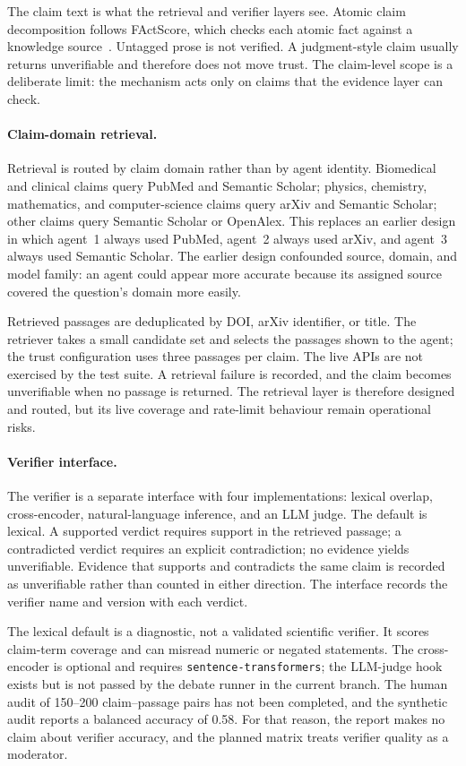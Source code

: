 The claim text is what the retrieval and verifier layers see. Atomic claim decomposition follows FActScore, which checks each atomic fact against a knowledge source~\cite{min2023factscore}. Untagged prose is not verified. A judgment-style claim usually returns unverifiable and therefore does not move trust. The claim-level scope is a deliberate limit: the mechanism acts only on claims that the evidence layer can check.

\paragraph*{Claim-domain retrieval.}
Retrieval is routed by claim domain rather than by agent identity. Biomedical and clinical claims query PubMed and Semantic Scholar; physics, chemistry, mathematics, and computer-science claims query arXiv and Semantic Scholar; other claims query Semantic Scholar or OpenAlex. This replaces an earlier design in which agent~1 always used PubMed, agent~2 always used arXiv, and agent~3 always used Semantic Scholar. The earlier design confounded source, domain, and model family: an agent could appear more accurate because its assigned source covered the question's domain more easily.

Retrieved passages are deduplicated by DOI, arXiv identifier, or title. The retriever takes a small candidate set and selects the passages shown to the agent; the trust configuration uses three passages per claim. The live APIs are not exercised by the test suite. A retrieval failure is recorded, and the claim becomes unverifiable when no passage is returned. The retrieval layer is therefore designed and routed, but its live coverage and rate-limit behaviour remain operational risks.

\paragraph*{Verifier interface.}
The verifier is a separate interface with four implementations: lexical overlap, cross-encoder, natural-language inference, and an LLM judge. The default is lexical. A supported verdict requires support in the retrieved passage; a contradicted verdict requires an explicit contradiction; no evidence yields unverifiable. Evidence that supports and contradicts the same claim is recorded as unverifiable rather than counted in either direction. The interface records the verifier name and version with each verdict.

The lexical default is a diagnostic, not a validated scientific verifier. It scores claim-term coverage and can misread numeric or negated statements. The cross-encoder is optional and requires \texttt{sentence-transformers}; the LLM-judge hook exists but is not passed by the debate runner in the current branch. The human audit of 150--200 claim--passage pairs has not been completed, and the synthetic audit reports a balanced accuracy of 0.58. For that reason, the report makes no claim about verifier accuracy, and the planned matrix treats verifier quality as a moderator.

